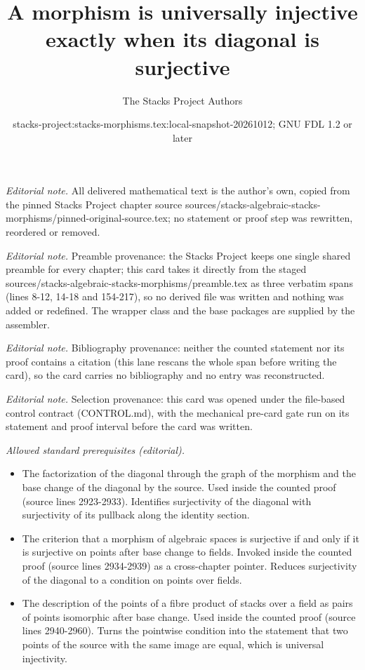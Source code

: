 \documentclass[10pt,a4paper]{amsart}
\title{A morphism is universally injective exactly when its diagonal is surjective}
\author{The Stacks Project Authors}
\date{stacks-project:stacks-morphisms.tex:local-snapshot-20261012; GNU FDL 1.2 or later}
\theoremstyle{plain}
\theoremstyle{definition}
\theoremstyle{remark}
\numberwithin{equation}{subsection}
\begin{document}
\maketitle
\noindent\textit{Editorial note.} All delivered mathematical text is the author's own, copied from the pinned Stacks Project chapter source sources/stacks-algebraic-stacks-morphisms/pinned-original-source.tex; no statement or proof step was rewritten, reordered or removed.\par\medskip
\noindent\textit{Editorial note.} Preamble provenance: the Stacks Project keeps one single shared preamble for every chapter; this card takes it directly from the staged sources/stacks-algebraic-stacks-morphisms/preamble.tex as three verbatim spans (lines 8-12, 14-18 and 154-217), so no derived file was written and nothing was added or redefined. The wrapper class and the base packages are supplied by the assembler.\par\medskip
\noindent\textit{Editorial note.} Bibliography provenance: neither the counted statement nor its proof contains a citation (this lane rescans the whole span before writing the card), so the card carries no bibliography and no entry was reconstructed.\par\medskip
\noindent\textit{Editorial note.} Selection provenance: this card was opened under the file-based control contract (CONTROL.md), with the mechanical pre-card gate run on its statement and proof interval before the card was written.\par\medskip
\noindent\textit{Allowed standard prerequisites (editorial).}\begin{itemize}
\item The factorization of the diagonal through the graph of the morphism and the base change of the diagonal by the source. Used inside the counted proof (source lines 2923-2933). Identifies surjectivity of the diagonal with surjectivity of its pullback along the identity section.
\item The criterion that a morphism of algebraic spaces is surjective if and only if it is surjective on points after base change to fields. Invoked inside the counted proof (source lines 2934-2939) as a cross-chapter pointer. Reduces surjectivity of the diagonal to a condition on points over fields.
\item The description of the points of a fibre product of stacks over a field as pairs of points isomorphic after base change. Used inside the counted proof (source lines 2940-2960). Turns the pointwise condition into the statement that two points of the source with the same image are equal, which is universal injectivity.
\end{itemize}\medskip
\end{document}
